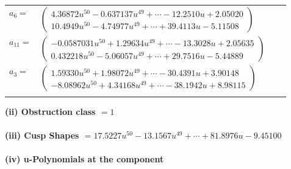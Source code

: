 \documentclass[1p]{elsarticle_modified}
\theoremstyle{definition}
\begin{document}
\begin{tabular}{m{7pt} m{180pt} m{7pt} m{180pt} }
\flushright $a_{6}=$&$\begin{pmatrix}4.36872 u^{50}-0.637137 u^{49}+\cdots-12.2510 u+2.05020\\10.4949 u^{50}-4.74977 u^{49}+\cdots+39.4113 u-5.11508\end{pmatrix}$ \\
\flushright $a_{11}=$&$\begin{pmatrix}-0.0587031 u^{50}+1.29634 u^{49}+\cdots-13.3028 u+2.05635\\0.432218 u^{50}-5.06057 u^{49}+\cdots+29.7516 u-5.44889\end{pmatrix}$ \\
\flushright $a_{3}=$&$\begin{pmatrix}1.59330 u^{50}+1.98072 u^{49}+\cdots-30.4391 u+3.90148\\-8.08962 u^{50}+4.34168 u^{49}+\cdots-38.1942 u+8.98115\end{pmatrix}$\\&\end{tabular}
\flushleft \textbf{(ii) Obstruction class $= 1$}\\~\\
\flushleft \textbf{(iii) Cusp Shapes $= 17.5227 u^{50}-13.1567 u^{49}+\cdots+81.8976 u-9.45100$}\\~\\
\newpage\renewcommand{\arraystretch}{1}
\flushleft \textbf{(iv) u-Polynomials at the component}\newline \\
\end{document}

